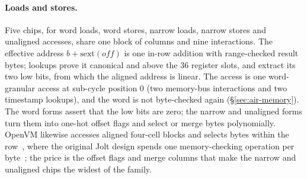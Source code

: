 \paragraph{Loads and stores.}\label{sec:base-memory} Five chips, for word loads, word stores, narrow loads, narrow stores and unaligned accesses, share one block of columns and nine interactions. The effective address $b + \mathrm{sext}(\mathit{off})$ is one in-row addition with range-checked result bytes; lookups prove it canonical and above the 36 register slots, and extract its two low bits, from which the aligned address is linear. The access is one word-granular access at sub-cycle position 0 (two memory-bus interactions and two timestamp lookups), and the word is not byte-checked again (\S\ref{sec:air-memory}). The word forms assert that the low bits are zero; the narrow and unaligned forms turn them into one-hot offset flags and select or merge bytes polynomially. OpenVM likewise accesses aligned four-cell blocks and selects bytes within the row~\citep[\S3.2.4]{openvm}, where the original Jolt design spends one memory-checking operation per byte~\citep{jolt}; the price is the offset flags and merge columns that make the narrow and unaligned chips the widest of the family.
